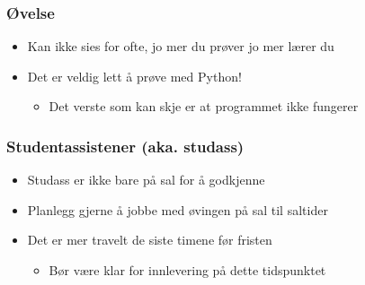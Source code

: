 \documentclass[screen, aspectratio=169]{beamer}
\begin{document}
\begin{frame}
	\frametitle{Øvelse}
	\begin{itemize}
		\item Kan ikke sies for ofte, jo mer du prøver jo mer lærer du
		\item Det er veldig lett å prøve med Python!
		\begin{itemize}
			\item Det verste som kan skje er at programmet ikke fungerer
		\end{itemize}
	\end{itemize}
\end{frame}

\begin{frame}
	\frametitle{Studentassistener (aka. studass)}
	\begin{itemize}
		\item Studass er ikke bare på sal for å godkjenne
		\item Planlegg gjerne å jobbe med øvingen på sal til saltider
		\item Det er mer travelt de siste timene før fristen
		\begin{itemize}
			\item Bør være klar for innlevering på dette tidspunktet
		\end{itemize}
	\end{itemize}
\end{frame}
\end{document}

